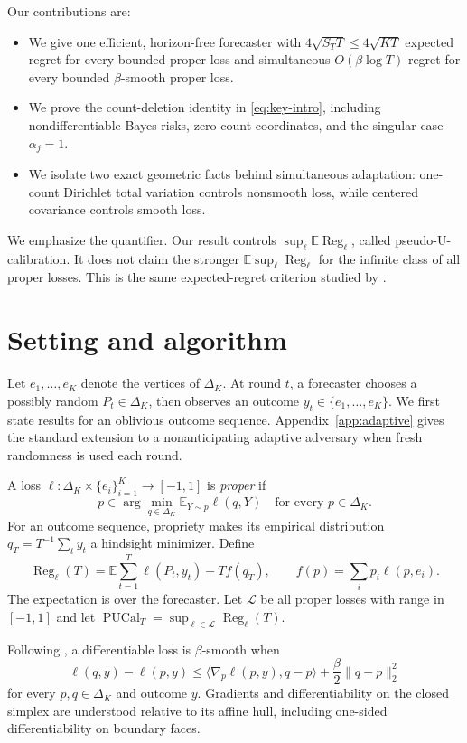 \documentclass{article}
\theoremstyle{definition}
\theoremstyle{remark}
\newcommand{\E}{\mathbb E}
\newcommand{\DeltaK}{\Delta_K}
\newcommand{\Reg}{\operatorname{Reg}}
\newcommand{\PUCal}{\operatorname{PUCal}}
\begin{document}
Our contributions are:
\begin{itemize}
 \item We give one efficient, horizon-free forecaster with
$4\sqrt{S_TT}\leq4\sqrt{KT}$ expected regret for every bounded proper loss and simultaneous $O(\beta\log T)$ regret for every bounded $\beta$-smooth proper loss.
 \item We prove the count-deletion identity in \eqref{eq:key-intro}, including
nondifferentiable Bayes risks, zero count coordinates, and the singular case $\alpha_j=1$.
 \item We isolate two exact geometric facts behind simultaneous adaptation:
one-count Dirichlet total variation controls nonsmooth loss, while centered covariance controls smooth loss.
\end{itemize}

We emphasize the quantifier.  Our result controls $\sup_\ell\E\Reg_\ell$, called pseudo-U-calibration.  It does not claim the stronger $\E\sup_\ell\Reg_\ell$ for the infinite class of all proper losses. This is the same expected-regret criterion studied by \citet{frongillo2026simultaneous}.

\section{Setting and algorithm}\label{sec:setting}

Let $e_1,\ldots,e_K$ denote the vertices of $\DeltaK$.  At round $t$, a forecaster chooses a possibly random $P_t\in\DeltaK$, then observes an outcome $y_t\in\{e_1,\ldots,e_K\}$.  We first state results for an oblivious outcome sequence.  Appendix~\ref{app:adaptive} gives the standard extension to a nonanticipating adaptive adversary when fresh randomness is used each round.

A loss $\ell:\DeltaK\times\{e_i\}_{i=1}^K\to[-1,1]$ is \emph{proper} if \[ p\in\arg\min_{q\in\DeltaK}\E_{Y\sim p}\ell(q,Y) \quad\text{for every }p\in\DeltaK. \] For an outcome sequence, propriety makes its empirical distribution $q_T=T^{-1}\sum_ty_t$ a hindsight minimizer.  Define \[ \Reg_\ell(T)=\E\sum_{t=1}^T\ell(P_t,y_t)-T f(q_T), \qquad f(p)=\sum_i p_i\ell(p,e_i). \] The expectation is over the forecaster.  Let $\mathcal L$ be all proper losses with range in $[-1,1]$ and let $\PUCal_T=\sup_{\ell\in\mathcal L}\Reg_\ell(T)$.

Following \citet{frongillo2026simultaneous}, a differentiable loss is $\beta$-smooth when
\begin{equation}
 \ell(q,y)-\ell(p,y)
 \leq\langle\nabla_p\ell(p,y),q-p\rangle
       +\frac\beta2\|q-p\|_2^2                 \tag{2}\label{eq:smooth}
\end{equation}
for every $p,q\in\DeltaK$ and outcome $y$. Gradients and differentiability on the closed simplex are understood relative to its affine hull, including one-sided differentiability on boundary faces.
\end{document}
